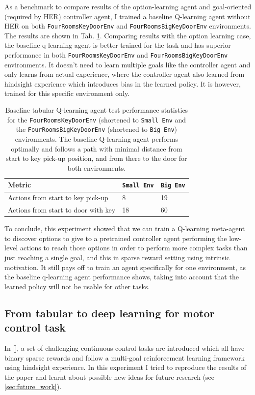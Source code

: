 \documentclass[conference]{IEEEtran}
\begin{document}
As a benchmark to compare results of the option-learning agent and goal-oriented (required by HER) controller agent, I trained a baseline Q-learning agent without HER on both \texttt{FourRoomsKeyDoorEnv} and \texttt{FourRoomsBigKeyDoorEnv} environments. The results are shown in Tab. \ref{tab:exp_baseline_tabular_qlearning}. Comparing results with the option learning case, the baseline q-learning agent is better trained for the task and has superior performance in both \texttt{FourRoomsKeyDoorEnv} and \texttt{FourRoomsBigKeyDoorEnv} environments. It doesn't need to learn multiple goals like the controller agent and only learns from actual experience, where the controller agent also learned from hindsight experience which introduces bias in the learned policy. It is however, trained for this specific environment only.

\begin{table}[ht]
\centering
\begin{tabular}{|l|l|l|}
  \hline
  Metric & \texttt{Small Env} & \texttt{Big Env} \\
  \hline
  Actions from start to key pick-up   & 8 & 19 \\
  Actions from start to door with key & 18 & 60 \\
  \hline
\end{tabular}
\caption{Baseline tabular Q-learning agent test performance statistics for the \texttt{FourRoomsKeyDoorEnv} (shortened to \texttt{Small Env} and the \texttt{FourRoomsBigKeyDoorEnv} (shortened to \texttt{Big Env}) environments. The baseline Q-learning agent performs optimally and follows a path with minimal distance from start to key pick-up position, and from there to the door for both environments.}
\label{tab:exp_baseline_tabular_qlearning}
\end{table}

To conclude, this experiment showed that we can train a Q-learning meta-agent to discover options to give to a pretrained controller agent performing the low-level actions to reach those options in order to perform more complex tasks than just reaching a single goal, and this in sparse reward setting using intrinsic motivation. It still pays off to train an agent specifically for one environment, as the baseline q-learning agent performance shows, taking into account that the learned policy will not be usable for other tasks.

\subsection{From tabular to deep learning for motor control task}
In [\cite{plappert2018multi}], a set of challenging continuous control tasks are introduced which all have binary sparse rewards and follow a multi-goal reinforcement learning framework using hindsight experience. In this experiment I tried to reproduce the results of the paper and learnt about possible new ideas for future research (see \ref{sec:future_work}). 
\end{document}
